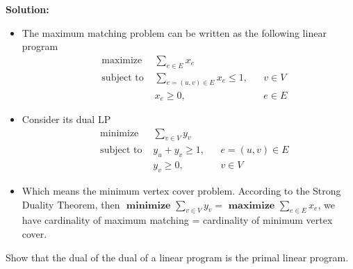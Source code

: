 \documentclass{article}
\newcounter{exercise}
\newcommand{\<}{
    \langle}
\renewcommand{\>}{
    \rangle}
\begin{document}
{\textbf{Solution:}
\begin{itemize}
    \item The maximum matching problem can be written as the following linear program
		$$\begin{aligned}
			&\text { maximize } &\sum_{e\in E}{x_e}&&\\
			&\text { subject to }& \sum_{e=(u,v)\in E}x_{e}\leq 1, &&v\in V\\
			& & {x_e\geq 0,}&&e\in E
			\end{aligned}$$
    \item Consider its dual LP
		$$\begin{aligned}
			&\text { minimize } &\sum_{v\in V}{y_v}&&\\
			&\text { subject to }& y_u+y_v\geq 1, &&e=(u,v)\in E\\
			& & {y_v\geq 0,}&&v\in V
			\end{aligned}$$
			\item Which means the minimum vertex cover problem. According to the Strong Duality Theorem, then $\textbf { minimize } \sum_{v\in V}{y_v} = \textbf { maximize } \sum_{e\in E}{x_e}$, we have cardinality of maximum matching = cardinality of minimum vertex cover.
\end{itemize}
\newpage



\begin{exercise}
	Show that the dual of the dual of a linear program is the primal linear program.
\end{exercise}

}
\end{document}
